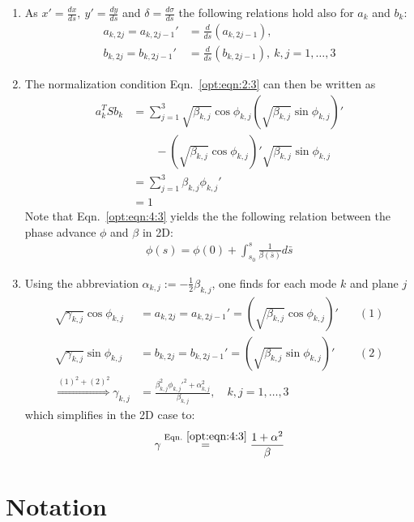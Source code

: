 \documentclass[english]{article}
\begin{document}
\begin{enumerate}
\item As $x'=\frac{dx}{ds},\ y'=\frac{dy}{ds}$ and $\delta=\frac{d\sigma}{ds}$ the following relations hold also for $a_k$ and $b_k$:
\begin{align}
a_{k,2j}=a_{k,2j-1}'&=\frac{d}{ds}(a_{k,2j-1}), \\
b_{k,2j}=b_{k,2j-1}'&=\frac{d}{ds}(b_{k,2j-1}),\ k,j=1,\ldots,3 
\end{align}
\item The normalization condition Eqn.~\ref{opt:eqn:2:3} can then be written as
\begin{align}
a_k^TSb_k&=\sum_{j=1}^3\sqrt{\beta_{k,j}}\cos{\phi_{k,j}}\left(\sqrt{\beta_{k,j}}\sin{\phi_{k,j}}\right)'\nonumber\\
& \qquad -\left(\sqrt{\beta_{k,j}}\cos{\phi_{k,j}}\right)'\sqrt{\beta_{k,j}}\sin{\phi_{k,j}}\nonumber\\
&=\sum_{j=1}^3\beta_{k,j}\phi_{k,j}'\nonumber\\
&=1 \label{opt:eqn:4:3}
\end{align}
Note that Eqn.~\ref{opt:eqn:4:3} yields the the following relation between the phase advance $\phi$ and $\beta$ in 2D:
\begin{align}
\phi(s)=\phi(0)+\int_{s_0}^s\frac{1}{\beta(\bar s)}d\bar s
\end{align}
\item Using the abbreviation $\alpha_{k,j}:=-\frac{1}{2}\beta_{k,j}$, one finds for each mode $k$ and plane $j$
\begin{align}
\sqrt{\gamma_{k,j}}\cos{\phi_{k,j}}&=a_{k,2j}=a_{k,2j-1}'=(\sqrt{\beta_{k,j}}\cos{\phi_{k,j}})' &\quad (1)\nonumber\\
\sqrt{\gamma_{k,j}}\sin{\phi_{k,j}}&=b_{k,2j}=b_{k,2j-1}'=(\sqrt{\beta_{k,j}}\sin{\phi_{k,j}})' &\quad (2)\nonumber\\
\overset{(1)^2+(2)^2}{\Rightarrow} \gamma_{k,j}&=\frac{\beta_{k,j}^2\phi_{k,j}'^2+\alpha_{k,j}^2}{\beta_{k,j}}, \quad k,j=1,\ldots,3 &
\end{align}
which simplifies in the 2D case to:
\begin{align}
\gamma\overset{\rm Eqn.~\ref{opt:eqn:4:3}}{=}\frac{1+\alpha^2}{\beta}
\end{align}
\end{enumerate}

\section{Notation}
\end{document}
